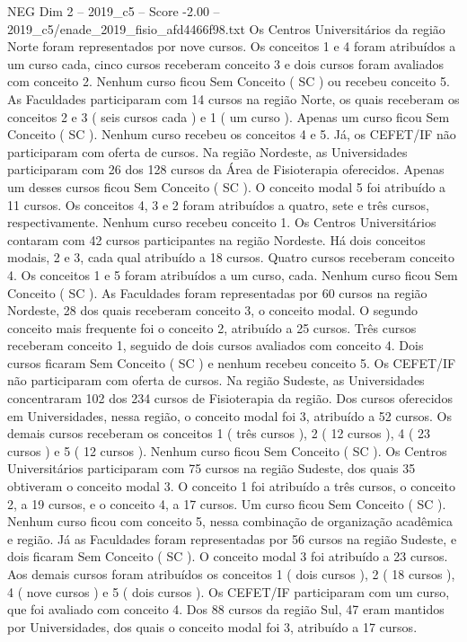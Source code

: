 \begin{textsample}{NEG Dim 2 – 2019\_c5 – Score -2.00 – 2019\_c5/enade\_2019\_fisio\_afd4466f98.txt}
Os Centros Universitários da região Norte foram representados por nove cursos.
Os conceitos 1 e 4 foram atribuídos a um curso cada, cinco cursos receberam conceito 3 e dois cursos foram avaliados com conceito 2.
Nenhum curso ficou Sem Conceito ( SC ) ou recebeu conceito 5.
As Faculdades participaram com 14 cursos na região Norte, os quais receberam os conceitos 2 e 3 ( seis cursos cada ) e 1 ( um curso ).
Apenas um curso ficou Sem Conceito ( SC ).
Nenhum curso recebeu os conceitos 4 e 5.
Já, os CEFET/IF não participaram com oferta de cursos.
Na região Nordeste, as Universidades participaram com 26 dos 128 cursos da Área de Fisioterapia oferecidos.
Apenas um desses cursos ficou Sem Conceito ( SC ).
O conceito modal 5 foi atribuído a 11 cursos.
Os conceitos 4, 3 e 2 foram atribuídos a quatro, sete e três cursos, respectivamente.
Nenhum curso recebeu conceito 1.
Os Centros Universitários contaram com 42 cursos participantes na região Nordeste.
Há dois conceitos modais, 2 e 3, cada qual atribuído a 18 cursos.
Quatro cursos receberam conceito 4.
Os conceitos 1 e 5 foram atribuídos a um curso, cada.
Nenhum curso ficou Sem Conceito ( SC ).
As Faculdades foram representadas por 60 cursos na região Nordeste, 28 dos quais receberam conceito 3, o conceito modal.
O segundo conceito mais frequente foi o conceito 2, atribuído a 25 cursos.
Três cursos receberam conceito 1, seguido de dois cursos avaliados com conceito 4.
Dois cursos ficaram Sem Conceito ( SC ) e nenhum recebeu conceito 5.
Os CEFET/IF não participaram com oferta de cursos.
Na região Sudeste, as Universidades concentraram 102 dos 234 cursos de Fisioterapia da região.
Dos cursos oferecidos em Universidades, nessa região, o conceito modal foi 3, atribuído a 52 cursos.
Os demais cursos receberam os conceitos 1 ( três cursos ), 2 ( 12 cursos ), 4 ( 23 cursos ) e 5 ( 12 cursos ).
Nenhum curso ficou Sem Conceito ( SC ).
Os Centros Universitários participaram com 75 cursos na região Sudeste, dos quais 35 obtiveram o conceito modal 3.
O conceito 1 foi atribuído a três cursos, o conceito 2, a 19 cursos, e o conceito 4, a 17 cursos.
Um curso ficou Sem Conceito ( SC ).
Nenhum curso ficou com conceito 5, nessa combinação de organização acadêmica e região.
Já as Faculdades foram representadas por 56 cursos na região Sudeste, e dois ficaram Sem Conceito ( SC ).
O conceito modal 3 foi atribuído a 23 cursos.
Aos demais cursos foram atribuídos os conceitos 1 ( dois cursos ), 2 ( 18 cursos ), 4 ( nove cursos ) e 5 ( dois cursos ).
Os CEFET/IF participaram com um curso, que foi avaliado com conceito 4.
Dos 88 cursos da região Sul, 47 eram mantidos por Universidades, dos quais o conceito modal foi 3, atribuído a 17 cursos.

\end{textsample}
